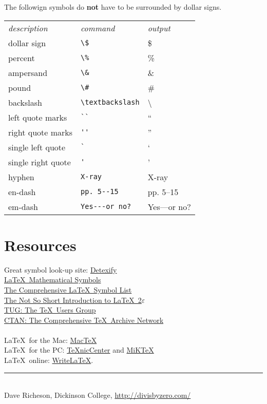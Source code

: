 \begin{multicols}{3}
The followign symbols do \textbf{not} have to be surrounded by dollar signs.

\begin{tabular}{lll}
\emph{description} & \emph{command} & \emph{output}\\
dollar sign & \verb!\$! & \$ \\
percent & \verb!\%! & \% \\
ampersand & \verb!\&! & \& \\
pound & \verb!\#! & \# \\
backslash & \verb!\textbackslash! & \textbackslash \\
left quote marks & \verb!``! & `` \\
right quote marks & \verb!''! & '' \\
single left quote  & \verb!`! & ` \\
single right quote  & \verb!'! & ' \\
hyphen & \verb!X-ray! & X-ray\\
en-dash & \verb!pp. 5--15! & pp. 5--15 \\
em-dash & \verb!Yes---or no?! & Yes---or no? 
\end{tabular}

\section{Resources}
Great symbol look-up site: \href{http://detexify.kirelabs.org/}{Detexify}\\
\href{http://amath.colorado.edu/documentation/LaTeX/Symbols.pdf}{\LaTeX\ Mathematical Symbols}\\
\href{ftp://tug.ctan.org/pub/tex-archive/info/symbols/comprehensive/symbols-letter.pdf}{The Comprehensive \LaTeX\ Symbol List}\\ 
\href{http://mirrors.med.harvard.edu/ctan/info/lshort/english/lshort.pdf}{The Not So Short Introduction to \LaTeX\ 2$\varepsilon$}\\
\href{http://www.tug.org/}{TUG: The \TeX\ Users Group}\\
\href{http://www.ctan.org/}{CTAN: The Comprehensive \TeX\ Archive Network}\\
~\\
\LaTeX\ for the Mac: \href{http://www.tug.org/mactex/}{Mac\TeX}\\
\LaTeX\ for the PC: \href{http://www.texniccenter.org/}{{\TeX}nicCenter} and \href{http://miktex.org/}{MiK\TeX}\\
\LaTeX\ online: \href{http://www.writelatex.com/}{WriteLaTeX}.
\vfill
\hrule
~\\
Dave Richeson, Dickinson College, \href{http://divisbyzero.com/}{http://divisbyzero.com/}
\end{multicols}